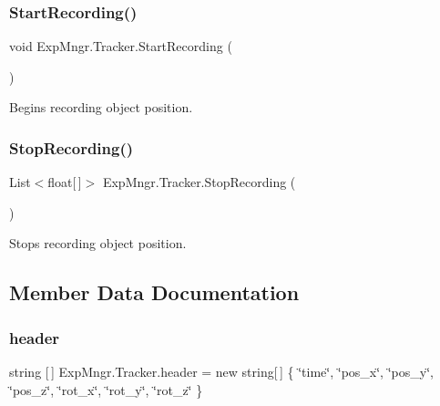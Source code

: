 \subsubsection{\texorpdfstring{Start\+Recording()}{StartRecording()}}
{\footnotesize\ttfamily void Exp\+Mngr.\+Tracker.\+Start\+Recording (\begin{DoxyParamCaption}{ }\end{DoxyParamCaption})}



Begins recording object position. 

\mbox{\label{class_exp_mngr_1_1_tracker_a21a718555e14883f0e4cd49f99f4a1e4}} 
\subsubsection{\texorpdfstring{Stop\+Recording()}{StopRecording()}}
{\footnotesize\ttfamily List$<$float\mbox{[}$\,$\mbox{]}$>$ Exp\+Mngr.\+Tracker.\+Stop\+Recording (\begin{DoxyParamCaption}{ }\end{DoxyParamCaption})}



Stops recording object position. 



\subsection{Member Data Documentation}
\mbox{\label{class_exp_mngr_1_1_tracker_ab05dfb3693984c0ce938f28efa067101}} 
\subsubsection{\texorpdfstring{header}{header}}
{\footnotesize\ttfamily string \mbox{[}$\,$\mbox{]} Exp\+Mngr.\+Tracker.\+header = new string\mbox{[}$\,$\mbox{]} \{ \char`\"{}time\char`\"{}, \char`\"{}pos\+\_\+x\char`\"{}, \char`\"{}pos\+\_\+y\char`\"{}, \char`\"{}pos\+\_\+z\char`\"{}, \char`\"{}rot\+\_\+x\char`\"{}, \char`\"{}rot\+\_\+y\char`\"{}, \char`\"{}rot\+\_\+z\char`\"{} \}\hspace{0.3cm}{\ttfamily [static]}}



